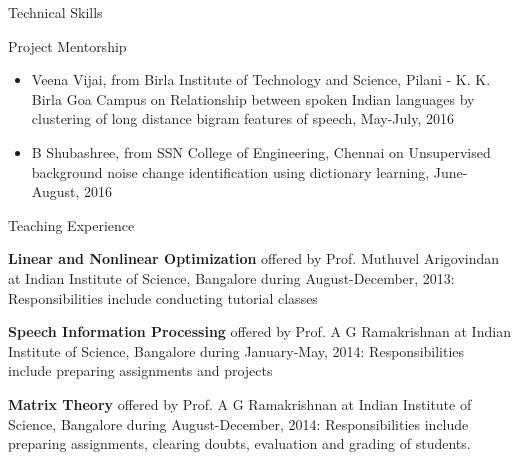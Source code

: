 \documentclass[10pt]{article}
\begin{document}
\begin{cv}
\begin{cvlist}{Technical Skills}
\begin{itemize}
	\end{itemize}

\end{cvlist}



\begin{cvlist}{Project Mentorship}
\item
\begin{itemize}


\item Veena Vijai, from Birla Institute of Technology and Science, Pilani - K. K. Birla Goa Campus  on Relationship between spoken Indian languages by clustering of long distance bigram features of speech, May-July, 2016

\item B Shubashree, from SSN College of Engineering, Chennai on Unsupervised background noise change identification using dictionary learning, June- August, 2016
\end{itemize}

\end{cvlist}






\begin{cvlist}{Teaching Experience}

\item 
 \textbf{Linear and Nonlinear Optimization} offered  by Prof. Muthuvel Arigovindan at  Indian Institute of Science, Bangalore during 
 August-December, 2013: Responsibilities include conducting tutorial classes  
\item
 \textbf{Speech Information Processing}  offered  by Prof. A G Ramakrishnan at  Indian Institute of Science, Bangalore during 
  January-May, 2014: Responsibilities include   preparing assignments and projects
  \item
   \textbf{Matrix Theory}  offered  by Prof. A G Ramakrishnan at  Indian Institute of Science, Bangalore during 
    August-December, 2014: Responsibilities include   preparing assignments, clearing doubts, evaluation and grading of students.
      


\end{cvlist}
\end{cv}
\end{document}
